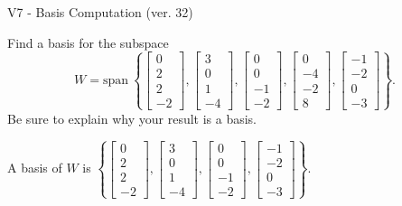 \begin{exercise}
  \begin{exerciseTitle}V7 - Basis Computation (ver. 32)\end{exerciseTitle}
  \begin{exerciseStatement}
    Find a basis for the subspace 
\[W=\mathrm{span}\ \left\{\left[\begin{array}{r}
0 \\
2 \\
2 \\
-2
\end{array}\right] , \left[\begin{array}{r}
3 \\
0 \\
1 \\
-4
\end{array}\right] , \left[\begin{array}{r}
0 \\
0 \\
-1 \\
-2
\end{array}\right] , \left[\begin{array}{r}
0 \\
-4 \\
-2 \\
8
\end{array}\right] , \left[\begin{array}{r}
-1 \\
-2 \\
0 \\
-3
\end{array}\right]\right\}.\]
 Be sure to explain why your result is a basis.


  \end{exerciseStatement}
  \begin{exerciseAnswer}
   A basis of \(W\) is  \(\left\{\left[\begin{array}{r}
0 \\
2 \\
2 \\
-2
\end{array}\right] , \left[\begin{array}{r}
3 \\
0 \\
1 \\
-4
\end{array}\right] , \left[\begin{array}{r}
0 \\
0 \\
-1 \\
-2
\end{array}\right] , \left[\begin{array}{r}
-1 \\
-2 \\
0 \\
-3
\end{array}\right]\right\}\).
  


  \end{exerciseAnswer}
\end{exercise}